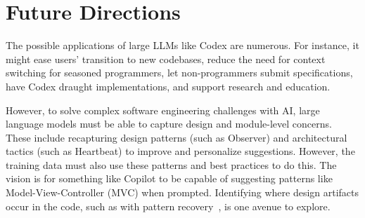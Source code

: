 \section{Future Directions}
\label{future}
The possible applications of large LLMs like Codex are numerous. 
For instance, it might ease users' transition to new codebases, reduce the need for context switching for seasoned programmers, let non-programmers submit specifications, have Codex draught implementations, and support research and education.

However, to solve complex software engineering challenges with AI, large language models must be able to capture design and module-level concerns. 
These include recapturing design patterns (such as Observer) and architectural tactics (such as Heartbeat) to improve and personalize suggestions. 
However, the training data must also use these patterns and best practices to do this.
The vision is for something like Copilot to be capable of suggesting patterns like Model-View-Controller (MVC) when prompted. 
Identifying where design artifacts occur in the code, such as with pattern recovery~\cite{Keim2020}, is one avenue to explore. 